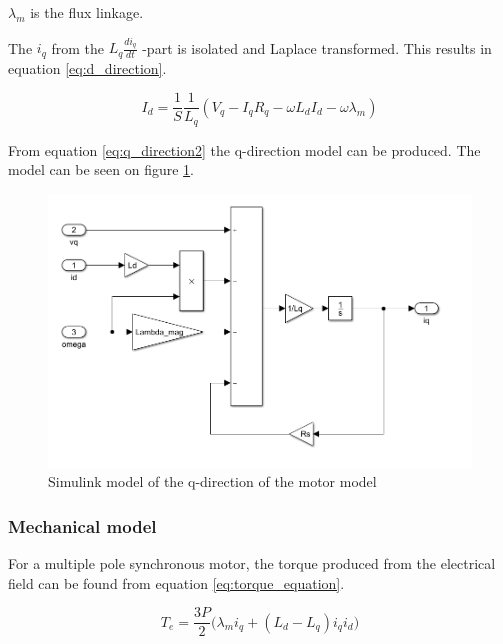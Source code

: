 
$\lambda_m$ is the flux linkage.

The $i_q$ from the $L_q \frac{di_q}{dt}$ -part is isolated and Laplace transformed. This results in equation \ref{eq:d_direction}.

\begin{equation}
    \label{eq:q_direction2}
    I_d = \frac{1}{S} \frac{1}{L_q} (V_q - I_q R_q - \omega L_d I_d - \omega \lambda_m)
\end{equation}

From equation \ref{eq:q_direction2} the q-direction model can be produced. The model can be seen on figure \ref{fig:simulink_q_direction}.

\begin{figure}[H]
	\centering
	\includegraphics[width=0.8\linewidth]{pictures/control/simulink_q_direction.PNG}
	\caption{Simulink model of the q-direction of the motor model}
	\label{fig:simulink_q_direction}
\end{figure}


\subsubsection{Mechanical model}
For a multiple pole synchronous motor, the torque produced from the electrical field can be found from equation \ref{eq:torque_equation}.

\begin{equation}
    \label{eq:torque_equation}
    T_e = \frac{3P}{2} \big(\lambda_m i_{q} + (L_d - L_q) i_q i_{d}\big)
\end{equation}

